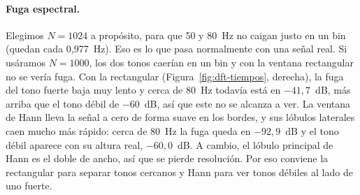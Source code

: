 \paragraph{Fuga espectral.}
Elegimos $N=1024$ a propósito, para que 50 y 80~Hz no caigan justo en un bin (quedan cada
0{,}977~Hz). Eso es lo que pasa normalmente con una señal real. Si usáramos $N=1000$, los dos
tonos caerían en un bin y con la ventana rectangular no se vería fuga. Con la rectangular
(Figura~\ref{fig:dft-tiempos}, derecha), la fuga del tono fuerte baja muy lento y cerca de 80~Hz
todavía está en $-41{,}7$~dB, más arriba que el tono débil de $-60$~dB, así que este no se
alcanza a ver. La ventana de Hann lleva la señal a cero de forma suave en los bordes, y sus
lóbulos laterales caen mucho más rápido: cerca de 80~Hz la fuga queda en $-92{,}9$~dB y el tono
débil aparece con su altura real, $-60{,}0$~dB. A cambio, el lóbulo principal de Hann es el doble
de ancho, así que se pierde resolución. Por eso conviene la rectangular para separar tonos
cercanos y Hann para ver tonos débiles al lado de uno fuerte.
